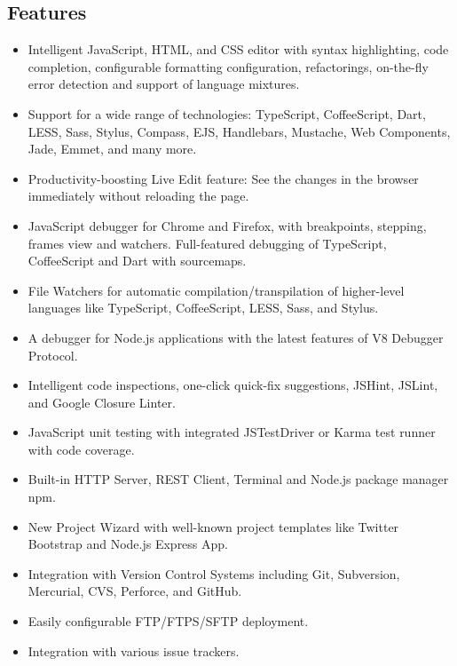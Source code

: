 \subsection{Features}
\begin{itemize}
\item Intelligent JavaScript, HTML, and CSS editor with syntax highlighting, code completion, configurable formatting configuration, refactorings, on-the-fly error detection and support of language mixtures.
\item Support for a wide range of technologies: TypeScript, CoffeeScript, Dart, LESS, Sass, Stylus, Compass, EJS, Handlebars, Mustache, Web Components, Jade, Emmet, and many more.
\item Productivity-boosting Live Edit feature: See the changes in the browser immediately without reloading the page.
\item 
JavaScript debugger for Chrome and Firefox, with breakpoints, stepping, frames view and watchers. Full-featured debugging of TypeScript, CoffeeScript and Dart with sourcemaps.
\item 
File Watchers for automatic compilation/transpilation of higher-level languages like TypeScript, CoffeeScript, LESS, Sass, and Stylus.
\item 
A debugger for Node.js applications with the latest features of V8 Debugger Protocol.
\item 
Intelligent code inspections, one-click quick-fix suggestions, JSHint, JSLint, and Google Closure Linter.
\item
JavaScript unit testing with integrated JSTestDriver or Karma test runner with code coverage. 
\item
Built-in HTTP Server, REST Client, Terminal and Node.js package manager npm. 
\item 
New Project Wizard with well-known project templates like Twitter Bootstrap and Node.js Express App.
\item
Integration with Version Control Systems including Git, Subversion, Mercurial, CVS, Perforce, and GitHub. 
\item 
Easily configurable FTP/FTPS/SFTP deployment.
\item 
Integration with various issue trackers.
\end{itemize}














